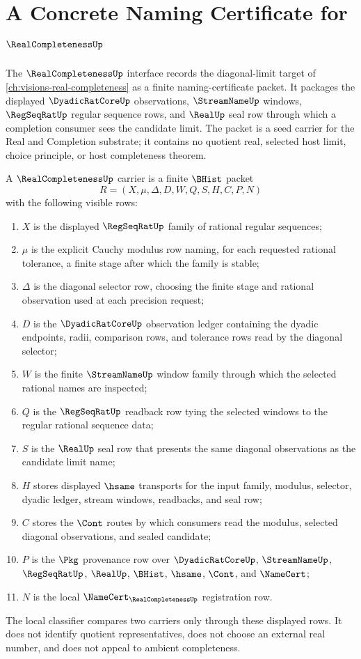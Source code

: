 \chapter{A Concrete Naming Certificate for $\RealCompletenessUp$}
\label{ch:concrete-instances-realcompleteness-namecert}

The $\RealCompletenessUp$ interface records the diagonal-limit target of \autoref{ch:visions-real-completeness} as a finite naming-certificate packet. It packages the displayed $\DyadicRatCoreUp$ observations, $\StreamNameUp$ windows, $\RegSeqRatUp$ regular sequence rows, and $\RealUp$ seal row through which a completion consumer sees the candidate limit. The packet is a seed carrier for the Real and Completion substrate; it contains no quotient real, selected host limit, choice principle, or host completeness theorem.

\begin{definition}
\label{def:real-completeness-carrier}
A $\RealCompletenessUp$ carrier is a finite $\BHist$ packet
$$
R=(X,\mu,\Delta,D,W,Q,S,H,C,P,N)
$$
with the following visible rows:
\begin{enumerate}
\item $X$ is the displayed $\RegSeqRatUp$ family of rational regular sequences;
\item $\mu$ is the explicit Cauchy modulus row naming, for each requested rational tolerance, a finite stage after which the family is stable;
\item $\Delta$ is the diagonal selector row, choosing the finite stage and rational observation used at each precision request;
\item $D$ is the $\DyadicRatCoreUp$ observation ledger containing the dyadic endpoints, radii, comparison rows, and tolerance rows read by the diagonal selector;
\item $W$ is the finite $\StreamNameUp$ window family through which the selected rational names are inspected;
\item $Q$ is the $\RegSeqRatUp$ readback row tying the selected windows to the regular rational sequence data;
\item $S$ is the $\RealUp$ seal row that presents the same diagonal observations as the candidate limit name;
\item $H$ stores displayed $\hsame$ transports for the input family, modulus, selector, dyadic ledger, stream windows, readbacks, and seal row;
\item $C$ stores the $\Cont$ routes by which consumers read the modulus, selected diagonal observations, and sealed candidate;
\item $P$ is the $\Pkg$ provenance row over $\DyadicRatCoreUp$, $\StreamNameUp$, $\RegSeqRatUp$, $\RealUp$, $\BHist$, $\hsame$, $\Cont$, and $\NameCert$;
\item $N$ is the local $\NameCert_{\RealCompletenessUp}$ registration row.
\end{enumerate}
The local classifier compares two carriers only through these displayed rows. It does not identify quotient representatives, does not choose an external real number, and does not appeal to ambient completeness.
\end{definition}

